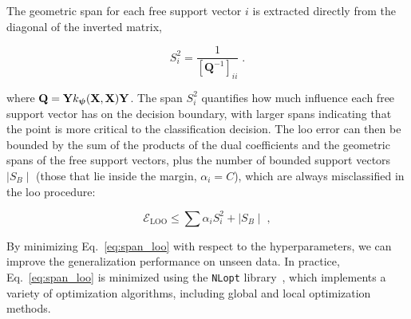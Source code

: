 \smallskip
The geometric span for each free support vector $i$ is extracted directly from the diagonal of the inverted matrix,

\begin{equation}
    S_i^2 = \frac{1}{[\mathbf{Q}^{-1}]_{ii}} \;.
\end{equation}

where $\mathbf{Q} = \mathbf{Y} k_{\boldsymbol{\psi}}(\mathbf{X},\mathbf{X}) \mathbf{Y}$. The span $S_i^2$ quantifies how much influence each free support vector has on the decision boundary, with larger spans indicating that the point is more critical to the classification decision. The \gls{loo} error can then be bounded by the sum of the products of the dual coefficients and the geometric spans of the free support vectors, plus the number of bounded support vectors $\mid S_B \mid$ (those that lie inside the margin, $\alpha_i = C$), which are always misclassified in the \gls{loo} procedure:

\begin{equation}
  \mathcal{E}_{\mathrm{LOO}} \leq \sum \alpha_i S_i^2 + \mid S_B \mid \;,
  \label{eq:span_loo}
\end{equation}

\smallskip
By minimizing Eq.~\eqref{eq:span_loo} with respect to the hyperparameters, we can improve the generalization performance on unseen data. In practice, Eq.~\eqref{eq:span_loo} is minimized using the \texttt{NLopt} library~\cite{nlopt}, which implements a variety of optimization algorithms, including global and local optimization methods.

